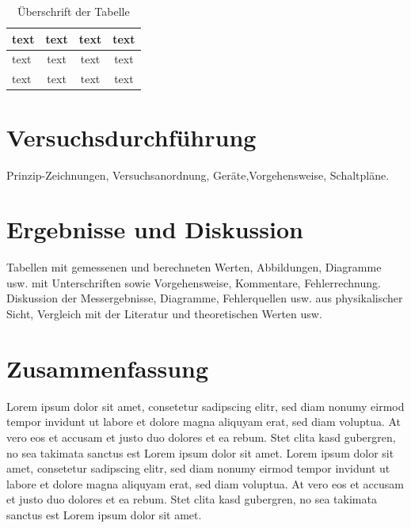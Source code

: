 \documentclass[a4paper,twoside,final]{article}
\begin{document}


\begin{table}[ht]
	\centering
	\caption{Überschrift der Tabelle}
	\label{tab:Tabelle1}
	\begin{tabular}{l c c c}
		\toprule
	    text & text & text & text\\
	 	\midrule
			text & text & text & text\\
			text & text & text & text
	\end{tabular}
\end{table}

\section{Versuchsdurchführung} \label{sec:Versuchsdurchführung}
Prinzip-Zeichnungen, Versuchsanordnung, Geräte,Vorgehensweise, Schaltpläne.


\section{Ergebnisse und Diskussion}
Tabellen mit gemessenen und berechneten Werten, Abbildungen, Diagramme usw. mit Unterschriften sowie Vorgehensweise, Kommentare, Fehlerrechnung.\\
Diskussion der Messergebnisse, Diagramme, Fehlerquellen usw. aus physikalischer Sicht, Vergleich mit der Literatur und theoretischen Werten usw.

\section{Zusammenfassung}
Lorem ipsum dolor sit amet, consetetur sadipscing elitr, sed diam nonumy eirmod tempor invidunt ut labore et dolore magna aliquyam erat, sed diam voluptua. At vero eos et accusam et justo duo dolores et ea rebum. Stet clita kasd gubergren, no sea takimata sanctus est Lorem ipsum dolor sit amet. Lorem ipsum dolor sit amet, consetetur sadipscing elitr, sed diam nonumy eirmod tempor invidunt ut labore et dolore magna aliquyam erat, sed diam voluptua. At vero eos et accusam et justo duo dolores et ea rebum. Stet clita kasd gubergren, no sea takimata sanctus est Lorem ipsum dolor sit amet.
\end{document}
